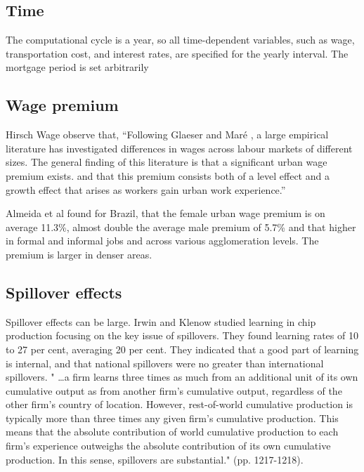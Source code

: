 \subsection{Time}
 The computational cycle is a year, so all time-dependent variables, such as wage, transportation cost, and interest rates, are specified for the yearly interval. The mortgage period is set arbitrarily 
 
\subsection{Wage premium} \label{section-wage-premium}

Hirsch Wage \cite{hirschUrbanWagePremium2019} observe that, ``Following Glaeser and Maré \cite{glaeserCitiesSkills2001},  a  large  empirical  literature  has  investigated differences in wages across labour markets of different sizes. The general finding of this literature is that a significant urban wage premium exists. and that this premium consists both of a level effect and a growth effect that arises as workers gain urban work experience.'' 

Almeida et al \cite{almeidaUrbanWagePremium2022} found for Brazil, that the female urban wage premium is on average 11.3\%, almost double the average male premium of 5.7\% and that higher in formal and informal jobs and across various agglomeration levels. The premium is larger in denser areas.

\subsection{Spillover effects} \label{section-spillover}

Spillover effects can be large. Irwin and Klenow  studied learning in chip production focusing  on the key issue of spillovers. They found learning rates of 10 to 27 per cent, averaging 20 per cent. They indicated that a good part of learning is internal, and that national spillovers were no greater than international spillovers. " \dots a firm learns three times as much from an additional unit of its own cumulative output as from another firm's cumulative output, regardless of the other firm's country of location. However, rest-of-world cumulative production is typically more than three times any given firm's cumulative production. This means that the absolute contribution of world cumulative production to each firm's experience outweighs the absolute contribution of its own cumulative production. In this sense, spillovers are substantial." (pp. 1217-1218).


